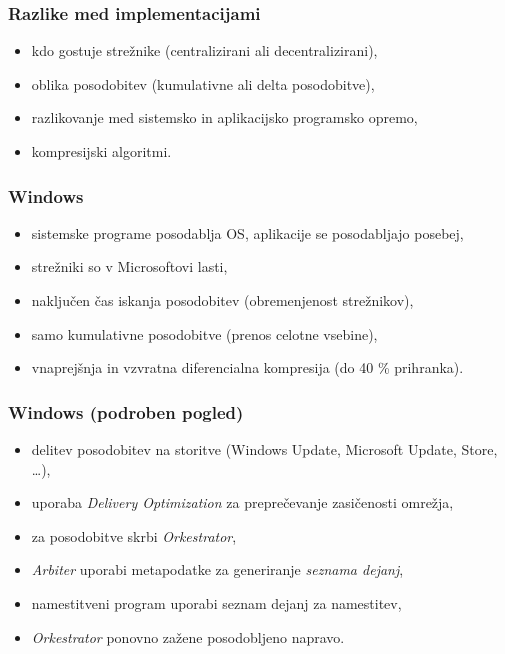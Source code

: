 \documentclass[aspectratio=169]{beamer}
\begin{document}
    \begin{frame}
        \frametitle{Razlike med implementacijami}
        \begin{itemize}
            \item kdo gostuje strežnike (centralizirani ali decentralizirani),
            \item oblika posodobitev (kumulativne ali delta posodobitve),
            \item razlikovanje med sistemsko in aplikacijsko programsko opremo,
            \item kompresijski algoritmi.
        \end{itemize}
    \end{frame}

    \begin{frame}
        \frametitle{Windows}
        \begin{itemize}
            \item sistemske programe posodablja OS, aplikacije se posodabljajo posebej,
            \item strežniki so v Microsoftovi lasti,
            \item naključen čas iskanja posodobitev (obremenjenost strežnikov),
            \item samo kumulativne posodobitve (prenos celotne vsebine),
            \item vnaprejšnja in vzvratna diferencialna kompresija (do 40 \% prihranka).
        \end{itemize}
    \end{frame}

    \begin{frame}
        \frametitle{Windows (podroben pogled)}
        \begin{itemize}
            \item delitev posodobitev na storitve (Windows Update, Microsoft Update, Store, \ldots),
            \item uporaba \emph{Delivery Optimization} za preprečevanje zasičenosti omrežja,
            \item za posodobitve skrbi \emph{Orkestrator},
            \item \emph{Arbiter} uporabi metapodatke za generiranje \emph{seznama dejanj},
            \item namestitveni program uporabi seznam dejanj za namestitev,
            \item \emph{Orkestrator} ponovno zažene posodobljeno napravo.
        \end{itemize}
    \end{frame}
\end{document}
